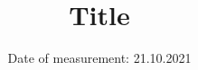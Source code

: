 

\subject{\vspace{-4cm}Labreport n}  %
\title{\vspace{-0.5cm}Title} %
\date{\vspace{-0.5cm}
 Date of measurement: 21.10.2021  %
}




\twocolumn[
\maketitle
\begin{onecolabstract}
  
\end{onecolabstract}
]






\printbibliography{}


